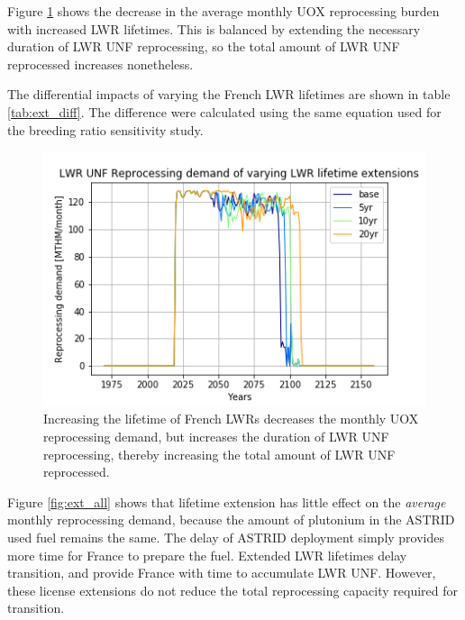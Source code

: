 Figure \ref{fig:ext_uox} shows the decrease in the average monthly
\gls{UOX} reprocessing burden with increased \gls{LWR} lifetimes.
This is balanced by extending the necessary duration of 
\gls{LWR} \gls{UNF} reprocessing,
so
the total amount of \gls{LWR} \gls{UNF} reprocessed increases nonetheless.


The differential impacts of varying the French \gls{LWR} lifetimes are
shown in table \ref{tab:ext_diff}. The difference were calculated
using the same equation used for the breeding ratio sensitivity study.

\begin{figure}[htbp!]
	\begin{center}
		\includegraphics[scale=0.7]{./images/sensitivity/ext_uox_rep.png}
	\end{center}
	\caption{Increasing the lifetime of French \glspl{LWR} decreases the monthly
		\gls{UOX} reprocessing demand, but increases the duration of \gls{LWR} \gls{UNF}
		reprocessing, thereby increasing the total amount of \gls{LWR} \gls{UNF} reprocessed.}
	\label{fig:ext_uox}
\end{figure}

Figure \ref{fig:ext_all} shows that lifetime extension has little
effect on the \emph{average} monthly reprocessing demand, because
the amount of plutonium in the \gls{ASTRID} used fuel remains the same.
The delay of \gls{ASTRID} deployment simply provides more time for
France to prepare the fuel. 
Extended \gls{LWR} lifetimes delay transition, and provide France with
time to accumulate \gls{LWR} \gls{UNF}. However, these 
license extensions do not reduce
the total reprocessing capacity required for transition.


